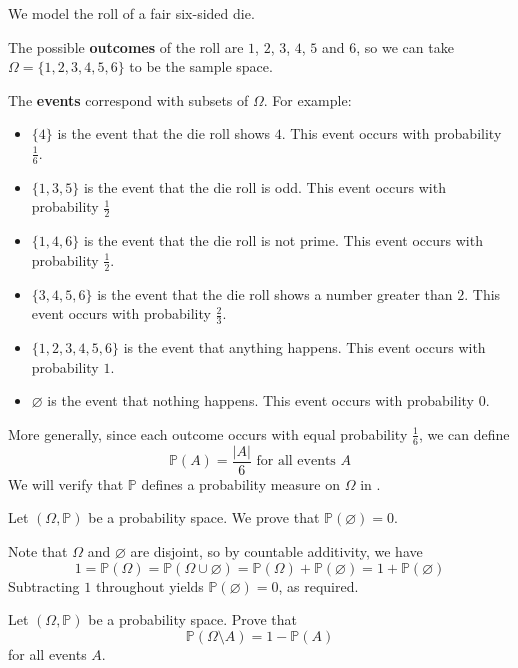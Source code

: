 \begin{example}
\label{exProbabilitySpaceSixSidedDie}
We model the roll of a fair six-sided die.

The possible \textbf{outcomes} of the roll are $1$, $2$, $3$, $4$, $5$ and $6$, so we can take $\Omega = \{ 1, 2, 3, 4, 5, 6 \}$ to be the sample space.

The \textbf{events} correspond with subsets of $\Omega$. For example:
\begin{itemize}
\item $\{ 4 \}$ is the event that the die roll shows $4$. This event occurs with probability $\frac{1}{6}$.
\item $\{ 1, 3, 5 \}$ is the event that the die roll is odd. This event occurs with probability $\frac{1}{2}$
\item $\{ 1, 4, 6 \}$ is the event that the die roll is not prime. This event occurs with probability $\frac{1}{2}$.
\item $\{ 3, 4, 5, 6 \}$ is the event that the die roll shows a number greater than $2$. This event occurs with probability $\frac{2}{3}$.
\item $\{ 1, 2, 3, 4, 5, 6 \}$ is the event that anything happens. This event occurs with probability $1$.
\item $\varnothing$ is the event that nothing happens. This event occurs with probability $0$.
\end{itemize}

More generally, since each outcome occurs with equal probability $\frac{1}{6}$, we can define
\[ \mathbb{P}(A) = \frac{|A|}{6} \text{ for all events } A \]
We will verify that $\mathbb{P}$ defines a probability measure on $\Omega$ in .
\end{example}

\begin{example}
\label{exProbabilityOfEmptySet}
Let $(\Omega,\mathbb{P})$ be a probability space. We prove that $\mathbb{P}(\varnothing)=0$.

Note that $\Omega$ and $\varnothing$ are disjoint, so by countable additivity, we have
\[ 1 = \mathbb{P}(\Omega) = \mathbb{P}(\Omega \cup \varnothing) = \mathbb{P}(\Omega) + \mathbb{P}(\varnothing) = 1 + \mathbb{P}(\varnothing) \]
Subtracting $1$ throughout yields $\mathbb{P}(\varnothing) = 0$, as required.
\end{example}

\begin{exercise}
Let $(\Omega,\mathbb{P})$ be a probability space. Prove that
\[ \mathbb{P}(\Omega \setminus A) = 1-\mathbb{P}(A) \]
for all events $A$.
\end{exercise}


